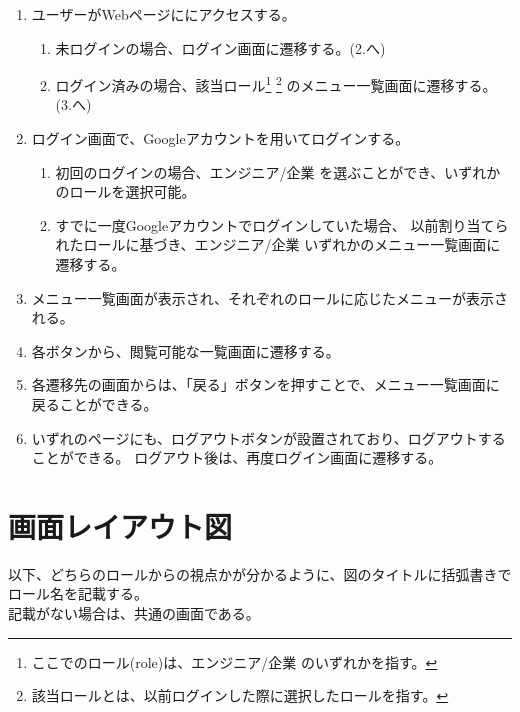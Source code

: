 \documentclass[10pt]{ltjsarticle}
\begin{document}
\vspace{-0.5cm}
\begin{enumerate}
    \item ユーザーがWebページににアクセスする。
    \begin{enumerate}
        \item 未ログインの場合、ログイン画面に遷移する。(2.へ)
        \item ログイン済みの場合、該当ロール\footnote{ここでのロール(role)は、エンジニア/企業 のいずれかを指す。}
        \footnote{該当ロールとは、以前ログインした際に選択したロールを指す。}
                のメニュー一覧画面に遷移する。(3.へ)
    \end{enumerate}
    \item ログイン画面で、Googleアカウントを用いてログインする。
    \begin{enumerate}
        \item 初回のログインの場合、エンジニア/企業 を選ぶことができ、いずれかのロールを選択可能。
        \item すでに一度Googleアカウントでログインしていた場合、
              以前割り当てられたロールに基づき、エンジニア/企業 いずれかのメニュー一覧画面に遷移する。
    \end{enumerate}
    \item メニュー一覧画面が表示され、それぞれのロールに応じたメニューが表示される。
    \item 各ボタンから、閲覧可能な一覧画面に遷移する。
    \item 各遷移先の画面からは、「戻る」ボタンを押すことで、メニュー一覧画面に戻ることができる。
    \item いずれのページにも、ログアウトボタンが設置されており、ログアウトすることができる。
        ログアウト後は、再度ログイン画面に遷移する。
\end{enumerate}



\newpage
\section{画面レイアウト図}
以下、どちらのロールからの視点かが分かるように、図のタイトルに括弧書きでロール名を記載する。\\
記載がない場合は、共通の画面である。
\end{document}
